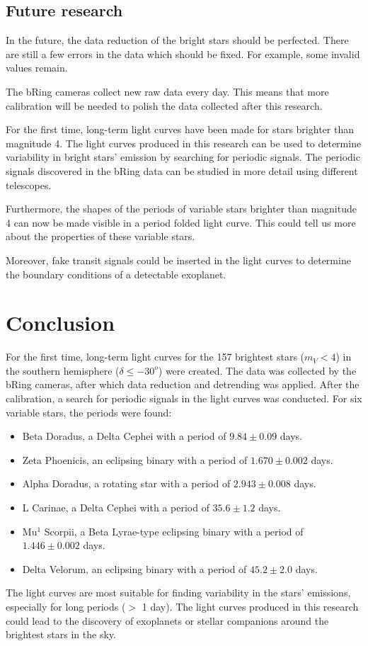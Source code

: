 \documentclass{aa}
\begin{document}
\subsection{Future research}
In the future, the data reduction of the bright stars should be perfected. There are still a few errors in the data which should be fixed. For example, some invalid values remain.

The bRing cameras collect new raw data every day. This means that more calibration will be needed to polish the data collected after this research.

For the first time, long-term light curves have been made for stars brighter than magnitude 4. The light curves produced in this research can be used to determine variability in bright stars' emission by searching for periodic signals. The periodic signals discovered in the bRing data can be studied in more detail using different telescopes.

Furthermore, the shapes of the periods of variable stars brighter than magnitude 4 can now be made visible in a period folded light curve. This could tell us more about the properties of these variable stars.

Moreover, fake transit signals could be inserted in the light curves to determine the boundary conditions of a detectable exoplanet. 



\section{Conclusion}
\label{sec:conclusion}
For the first time, long-term light curves for the 157 brightest stars ($m_V < 4$) in the southern hemisphere ($\delta \leq -30^o$) were created.
The data was collected by the bRing cameras, after which data reduction and detrending was applied. After the calibration, a search for periodic signals in the light curves was conducted. For six variable stars, the periods were found: 
\begin{itemize}
    \item Beta Doradus, a Delta Cephei with a period of $9.84 \pm 0.09$ days.
    \item Zeta Phoenicis, an eclipsing binary with a period of $1.670 \pm 0.002$ days.
    \item Alpha Doradus, a rotating star with a period of $2.943 \pm 0.008$ days.
    \item L Carinae, a Delta Cephei with a period of $35.6 \pm 1.2$ days.
    \item Mu$^1$ Scorpii, a Beta Lyrae-type eclipsing binary with a period of $1.446 \pm 0.002$ days.
    \item Delta Velorum, an eclipsing binary with a period of $45.2 \pm 2.0$ days.
\end{itemize}
The light curves are most suitable for finding variability in the stars' emissions, especially for long periods ($>$ 1 day). The light curves produced in this research could lead to the discovery of exoplanets or stellar companions around the brightest stars in the sky.
\end{document}
